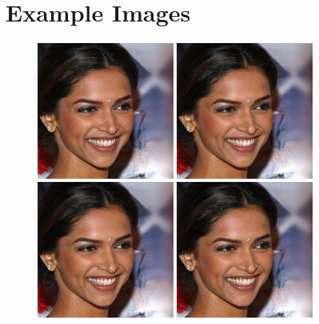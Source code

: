 \documentclass{article}
\begin{document}
    \appendix

    \section{Example Images}
    \begin{figure}[H]
        \centering
        \includegraphics[width=0.4\textwidth]{test_output/nearest celeb_a_hq.png}
        \includegraphics[width=0.4\textwidth]{test_output/bicubic celeb_a_hq.png}
        \includegraphics[width=0.4\textwidth]{test_output/model celeb_a_hq.png}
        \includegraphics[width=0.4\textwidth]{test_output/pretrained celeb_a_hq.png}

\end{figure}
\end{document}
